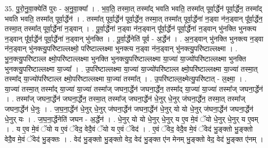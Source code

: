 \documentclass[17pt]{extarticle}
\begin{document}
35. पु॒रो॒नु॒वा॒क्येति॑ पुरः - अ॒नु॒वा॒क्या᳚ । . भ॒व॒ति॒ तस्मा॒त् तस्मा᳚द् भवति भवति॒ तस्मा᳚त् पूर्वा॒र्द्धेन॑ पूर्वा॒र्द्धेन॒ तस्मा᳚द् भवति भवति॒ तस्मा᳚त् पूर्वा॒र्द्धेन॑ । . तस्मा᳚त् पूर्वा॒र्द्धेन॑ पूर्वा॒र्द्धेन॒ तस्मा॒त् तस्मा᳚त् पूर्वा॒र्द्धेना॑ न॒ड्वा न॑न॒ड्वान् पू᳚र्वा॒र्द्धेन॒ तस्मा॒त् तस्मा᳚त् पूर्वा॒र्द्धेना॑ न॒ड्वान् । . पू॒र्वा॒र्द्धेना॑ न॒ड्वा न॑न॒ड्वान् पू᳚र्वा॒र्द्धेन॑ पूर्वा॒र्द्धेना॑ न॒ड्वान् भु॑नक्ति भुनक्त्य न॒ड्वान् पू᳚र्वा॒र्द्धेन॑ पूर्वा॒र्द्धेना॑ न॒ड्वान् भु॑नक्ति । . पू॒र्वा॒र्द्धेनेति॑ पूर्व - अ॒र्द्धेन॑ । . अ॒न॒ड्वान् भु॑नक्ति भुनक्त्य न॒ड्वा न॑न॒ड्वान् भु॑नक्त्यु॒परि॑ष्टाल्लक्ष्मो॒ परि॑ष्टाल्लक्ष्मा भुनक्त्य न॒ड्वा न॑न॒ड्वान् भु॑नक्त्यु॒परि॑ष्टाल्लक्ष्मा । . भु॒न॒क्त्यु॒परि॑ष्टाल्ल क्ष्मो॒परि॑ष्टाल्लक्ष्मा भुनक्ति भुनक्त्यु॒परि॑ष्टाल्लक्ष्मा या॒ज्या॑ या॒ज्यो॑परि॑ष्टाल्लक्ष्मा भुनक्ति भुनक्त्यु॒परि॑ष्टाल्लक्ष्मा या॒ज्या᳚ । . उ॒परि॑ष्टाल्लक्ष्मा या॒ज्या॑ या॒ज्यो॑परि॑ष्टाल्ल क्ष्मो॒परि॑ष्टाल्लक्ष्मा या॒ज्या॑ तस्मा॒त् तस्मा᳚द् या॒ज्यो॑परि॑ष्टाल्ल क्ष्मो॒परि॑ष्टाल्लक्ष्मा या॒ज्या॑ तस्मा᳚त् । . उ॒परि॑ष्टाल्ल॒क्ष्मेत्यु॒परि॑ष्टात् - ल॒क्ष्मा॒ । . या॒ज्या॑ तस्मा॒त् तस्मा᳚द् या॒ज्या॑ या॒ज्या॑ तस्मा᳚ज् जघना॒र्द्धेन॑ जघना॒र्द्धेन॒ तस्मा᳚द् या॒ज्या॑ या॒ज्या॑ तस्मा᳚ज् जघना॒र्द्धेन॑ । . तस्मा᳚ज् जघना॒र्द्धेन॑ जघना॒र्द्धेन॒ तस्मा॒त् तस्मा᳚ज् जघना॒र्द्धेन॑ धे॒नुर् धे॒नुर् ज॑घना॒र्द्धेन॒ तस्मा॒त् तस्मा᳚ज् जघना॒र्द्धेन॑ धे॒नुः । . ज॒घ॒ना॒र्द्धेन॑ धे॒नुर् धे॒नुर् ज॑घना॒र्द्धेन॑ जघना॒र्द्धेन॑ धे॒नुर् यो यो धे॒नुर् ज॑घना॒र्द्धेन॑ जघना॒र्द्धेन॑ धे॒नुर् यः । . ज॒घ॒ना॒र्द्धेनेति॑ जघन - अ॒र्द्धेन॑ । . धे॒नुर् यो यो धे॒नुर् धे॒नुर् य ए॒व मे॒वं ॅयो धे॒नुर् धे॒नुर् य ए॒वम् । . य ए॒व मे॒वं ॅयो य ए॒वं ॅवेद॒ वेदै॒वं ॅयो य ए॒वं ॅवेद॑ । . ए॒वं ॅवेद॒ वेदै॒व मे॒वं ॅवेद॑ भु॒ङ्क्तो भु॒ङ्क्तो वेदै॒व मे॒वं ॅवेद॑ भु॒ङ्क्तः । . वेद॑ भु॒ङ्क्तो भु॒ङ्क्तो वेद॒ वेद॑ भु॒ङ्क्त ए॑न मेनम् भु॒ङ्क्तो वेद॒ वेद॑ भु॒ङ्क्त ए॑नम् । \newline
\end{document}
